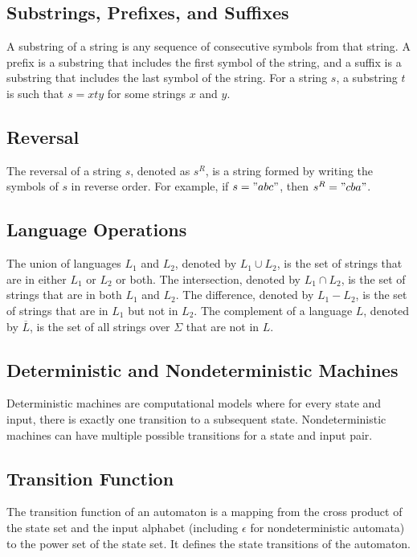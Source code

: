 \documentclass[hidelinks,12pt]{article}
\begin{document}
\subsection{Substrings, Prefixes, and Suffixes}
A substring of a string is any sequence of consecutive symbols from that
string. A prefix is a substring that includes the first symbol of the string,
and a suffix is a substring that includes the last symbol of the string. For a
string $s$, a substring $t$ is such that $s = xty$ for some strings $x$ and
$y$.

\subsection{Reversal}
The reversal of a string $s$, denoted as $s^R$, is a string formed by writing
the symbols of $s$ in reverse order. For example, if $s = "abc"$, then $s^R =
"cba"$.


\subsection{Language Operations}
The union of languages $L_1$ and $L_2$, denoted by $L_1 \cup L_2$, is the set
of strings that are in either $L_1$ or $L_2$ or both. The intersection, denoted
by $L_1 \cap L_2$, is the set of strings that are in both $L_1$ and $L_2$. The
difference, denoted by $L_1 - L_2$, is the set of strings that are in $L_1$ but
not in $L_2$. The complement of a language $L$, denoted by $\overline{L}$, is
the set of all strings over $\Sigma$ that are not in $L$.

\subsection{Deterministic and Nondeterministic Machines}
Deterministic machines are computational models where for every state and
input, there is exactly one transition to a subsequent state. Nondeterministic
machines can have multiple possible transitions for a state and input pair.

\subsection{Transition Function}
The transition function of an automaton is a mapping from the cross product of
the state set and the input alphabet (including $\epsilon$ for nondeterministic
automata) to the power set of the state set. It defines the state transitions
of the automaton.
\end{document}
